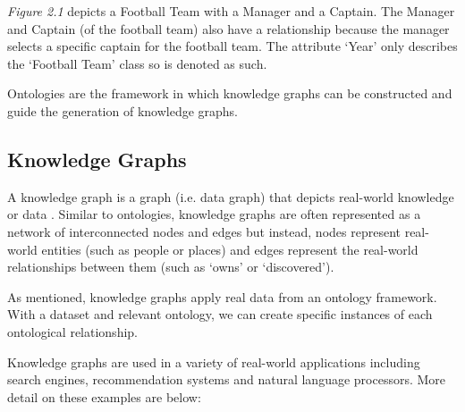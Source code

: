 \textit{Figure 2.1} depicts a Football Team with a Manager and a Captain. The Manager and Captain (of the football team) also have a relationship because the manager selects a specific captain for the football team. The attribute `Year' only describes the `Football Team' class so is denoted as such.

Ontologies are the framework in which knowledge graphs can be constructed and guide the generation of knowledge graphs. 

\subsection{Knowledge Graphs}
\hspace{0.5cm} A knowledge graph is a graph (i.e. data graph) that depicts real-world knowledge or data \cite{knowledgegraph}. Similar to ontologies, knowledge graphs are often represented as a network of interconnected nodes and edges but instead, nodes represent real-world entities (such as people or places) and edges represent the real-world relationships between them (such as `owns' or `discovered'). 

As mentioned, knowledge graphs apply real data from an ontology framework. With a dataset and relevant ontology, we can create specific instances of each ontological relationship. 

Knowledge graphs are used in a variety of real-world applications including search engines, recommendation systems and natural language processors. More detail on these examples are below:

